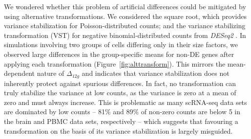 \documentclass[10pt,letterpaper]{article}
\begin{document}
We wondered whether this problem of artificial differences could be mitigated by using alternative transformations.
We considered the square root, which provides variance stabilization for Poisson-distributed counts;
and the variance stabilizing transformation (VST) for negative binomial-distributed counts from \emph{DESeq2} \cite{love2014moderated}.
In simulations involving two groups of cells differing only in their size factors, we observed large differences in the group-specific means for non-DE genes after applying each transformation (Figure~\ref{fig:alttransform}).
This mirrors the mean-dependent nature of $\Delta_{12g}$ and indicates that variance stabilization does not inherently protect against spurious differences.
In fact, no transformation can truly stabilize the variance at low counts, as the variance is zero at a mean of zero and must always increase.
This is problematic as many scRNA-seq data sets are dominated by low counts -- 81\% and 89\% of non-zero counts are below 5 in the brain and PBMC data sets, respectively --
which suggests that favouring a transformation on the basis of its variance stabilization is largely misguided.
\end{document}
